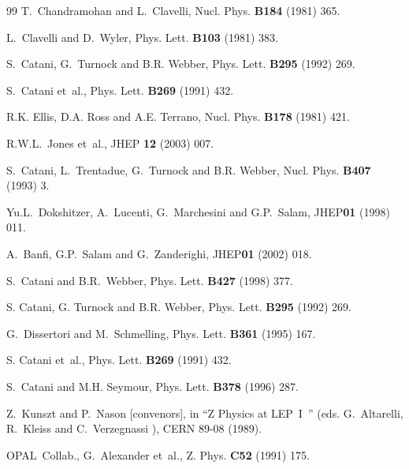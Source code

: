 \documentclass[12pt,a4paper,twoside]{article}
\newcommand{\Opal}{\mbox{\rm OPAL}}
\newcommand{\Aleph}{\mbox{\rm ALEPH}}
\newcommand{\Delphi}{\mbox{\rm DELPHI}}
\newcommand{\Lepone}{\mbox{LEP I }}
\begin{document}
\begin{thebibliography}{99}
T.~Chandramohan and L.~Clavelli, Nucl. Phys. {\bf B184} (1981) 365.

L.~Clavelli and D.~Wyler, Phys. Lett. {\bf B103} (1981) 383.

S.~Catani, G.~Turnock and B.R. Webber, Phys. Lett. {\bf B295} (1992) 269.

S.~Catani et~al., Phys. Lett. {\bf B269} (1991) 432.


R.K. Ellis, D.A. Ross and A.E. Terrano, Nucl. Phys. {\bf B178} (1981) 421.

R.W.L.~Jones et~al., JHEP {\bf 12} (2003) 007.

S.~Catani, L.~Trentadue, G.~Turnock and B.R. Webber, Nucl. Phys. {\bf B407} (1993) 3.

Yu.L.~Dokshitzer, A.~Lucenti, G.~Marchesini and  G.P.~Salam, JHEP{\bf 01} (1998) 011. 

A.~Banfi, G.P.~Salam and G.~Zanderighi, JHEP{\bf 01} (2002) 018.

S.~Catani and B.R.~Webber, Phys. Lett. {\bf B427} (1998) 377.

S. Catani,  G. Turnock and B.R. Webber,
Phys. Lett. {\bf B295} (1992) 269.

G.~Dissertori and M.~Schmelling, Phys. Lett. {\bf B361} (1995) 167.

S. Catani et~al., Phys. Lett. {\bf B269} (1991) 432.
 
S.~Catani and M.H. Seymour, Phys. Lett. {\bf B378} (1996) 287.

Z.~Kunszt and P.~Nason [convenors], in ``Z Physics at \Lepone'' (eds. G.~Altarelli,
                         R.~Kleiss and C.~Verzegnassi ), CERN 89-08 (1989).

\Opal\ Collab., G.~Alexander et~al., Z. Phys. {\bf C52} (1991) 175.


\end{thebibliography}
\end{document}
